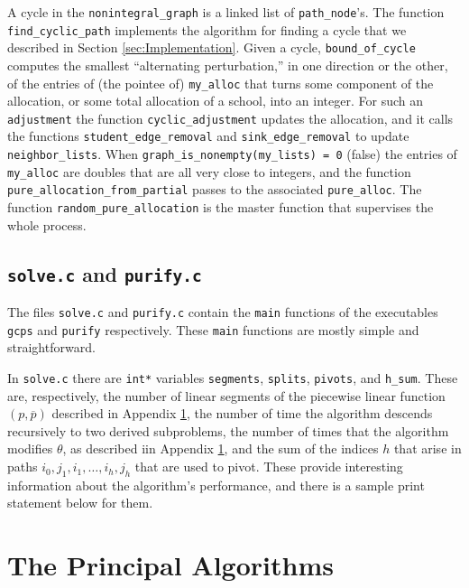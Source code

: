 \documentclass[12pt]{article}
\theoremstyle{definition}
\newcommand{\barp}{\overline{p}}
\begin{document}
\begin{appendix}
A cycle in the \texttt{nonintegral\_graph} is a linked list of
\texttt{path\_node}'s.  The function \texttt{find\_cyclic\_path}
implements the algorithm for finding a cycle that we described in
Section \ref{sec:Implementation}.  Given a cycle,
\texttt{bound\_of\_cycle} computes the smallest ``alternating
perturbation,'' in one direction or the other, of the entries of (the
pointee of) \texttt{my\_alloc} that turns some component of the
allocation, or some total allocation of a school, into an integer.
For such an \texttt{adjustment} the function
\texttt{cyclic\_adjustment} updates the allocation, and it calls the
functions \texttt{student\_edge\_removal} and
\texttt{sink\_edge\_removal} to update \texttt{neighbor\_lists}.
When \texttt{graph\_is\_nonempty(my\_lists) = 0} (false) the entries
of \texttt{my\_alloc} are doubles that are all very close to integers,
and the function \texttt{pure\_allocation\_from\_partial} passes to
the associated \texttt{pure\_alloc}.  The function
\texttt{random\_pure\_allocation} is the master function that
supervises the whole process.

\subsection{\texttt{solve.c} and  \texttt{purify.c}}

The files \texttt{solve.c} and \texttt{purify.c} contain the
\texttt{main} functions of the executables \texttt{gcps} and
\texttt{purify} respectively.  These \texttt{main} functions are
mostly simple and straightforward.

In \texttt{solve.c} there are \texttt{int*} variables
\texttt{segments}, \texttt{splits}, \texttt{pivots}, and
\texttt{h\_sum}.  These are, respectively, the number of linear
segments of the piecewise linear function $(p,\barp)$ described in
Appendix \ref{sec:Algorithms}, the number of time the algorithm
descends recursively to two derived subproblems, the number of times
that the algorithm modifies $\theta$, as described iin Appendix
\ref{sec:Algorithms}, and the sum of the indices $h$ that arise in
paths $i_0,j_1, i_1, \ldots, i_h, j_h$ that are used to pivot.  These
provide interesting information about the algorithm's performance, and
there is a sample print statement below for them.

\section{The Principal Algorithms} \label{sec:Algorithms}


\end{appendix}
\end{document}
